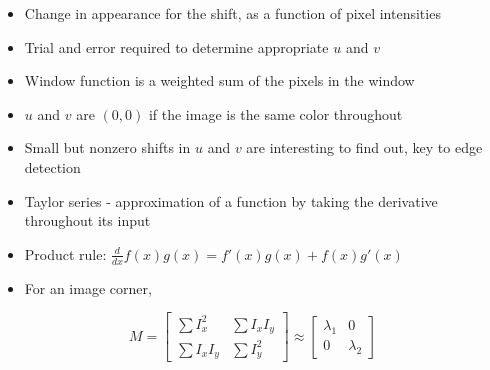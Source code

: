 \documentclass{article}
\begin{document}
\begin{itemize}
\item Change in appearance for the shift, as a function of pixel intensities
\item Trial and error required to determine appropriate $u$ and $v$ 
\item Window function is a weighted sum of the pixels in the window
\item $u$ and $v$ are $(0, 0)$ if the image is the same color throughout
\item Small but nonzero shifts in $u$ and $v$ are interesting to find out, key to edge detection
\item Taylor series - approximation of a function by taking the derivative throughout its input
\item Product rule: $\frac{d}{dx}f(x)g(x)=f'(x)g(x)+f(x)g'(x)$
\item For an image corner,
\end{itemize}
\begin{equation*}
M=\begin{bmatrix}
\sum I_x^2&\sum I_xI_y\\\sum I_xI_y&\sum I_y^2
\end{bmatrix}\approx 
\begin{bmatrix}
\lambda_1&0\\0&\lambda_2
\end{bmatrix}
\end{equation*}
\end{document}
